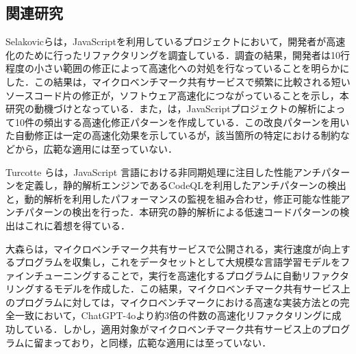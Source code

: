 \documentclass[submit,techrep,noauthor]{ipsj}
\newcommand{\memo}[1]{\colorbox{magenta!30}{{\bf MEMO}:}{\color{red!50} {\textbf{[#1]}}}}
\begin{document}


\subsection{関連研究}

Selakovicら\cite{jsRefac}は，JavaScriptを利用しているプロジェクトにおいて，開発者が高速化のために行ったリファクタリングを調査している．調査の結果，開発者は10行程度の小さい範囲の修正によって高速化への対処を行なっていることを明らかにした．この結果は，マイクロベンチマーク共有サービスで頻繁に比較される短いソースコード片の修正が，ソフトウェア高速化につながっていることを示し，本研究の動機づけとなっている．また，\cite{jsRefac}は，JavaScriptプロジェクトの解析によって10件の頻出する高速化修正パターンを作成している．この改良パターンを用いた自動修正は一定の高速化効果を示しているが，該当箇所の特定における制約などから，広範な適用には至っていない．

Turcotte ら\cite{DrAsync}は，JavaScript 言語における非同期処理に注目した性能アンチパターンを定義し，静的解析エンジンであるCodeQL\cite{ql}を利用したアンチパターンの検出と，動的解析を利用したパフォーマンスの監視を組み合わせ，修正可能な性能アンチパターンの検出を行った．本研究の静的解析による低速コードパターンの検出はこれに着想を得ている．

大森ら\cite{omori}は，マイクロベンチマーク共有サービスで公開される，実行速度が向上するプログラムを収集し，これをデータセットとして大規模な言語学習モデルをファインチューニングすることで，実行を高速化するプログラムに自動リファクタリングするモデルを作成した．この結果，マイクロベンチマーク共有サービス上のプログラムに対しては，マイクロベンチマークにおける高速な実装方法との完全一致において，ChatGPT-4oより約3倍の件数の高速化リファクタリングに成功している．しかし，適用対象がマイクロベンチマーク共有サービス上のプログラムに留まっており，\cite{jsRefac}と同様，広範な適用には至っていない．

\end{document}
